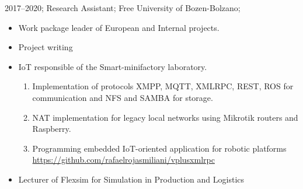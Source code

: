 \addwork%
{%
    2017--2020;%
    Research Assistant;%
    Free University of Bozen-Bolzano;%
    \begin{itemize}
        \item Work package leader of European and Internal projects.
        \item Project writing
        \item IoT responsible of the Smart-minifactory laboratory.
            \ifdefined\extended
                \begin{enumerate}
                    \item Implementation of protocols XMPP, MQTT, XMLRPC, REST, ROS for communication and NFS and SAMBA for storage.
                    \item NAT implementation for legacy local networks using Mikrotik routers and Raspberry.
                    \item Programming embedded IoT-oriented application for robotic platforms \href{https://github.com/rafaelrojasmiliani/vplusxmlrpc}{https://github.com/rafaelrojasmiliani/vplusxmlrpc}
                \end{enumerate}
            \fi
        \item Lecturer of Flexsim for Simulation in Production and Logistics             
    \end{itemize}
}%
%
